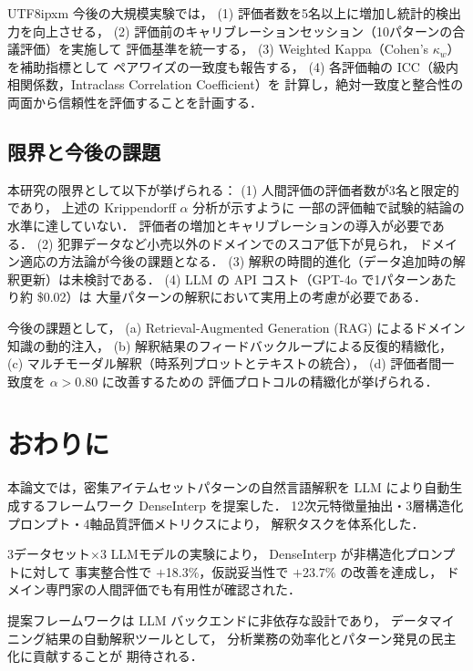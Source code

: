 \documentclass[conference]{IEEEtran}
\begin{document}
\begin{CJK}{UTF8}{ipxm}
今後の大規模実験では，
(1) 評価者数を5名以上に増加し統計的検出力を向上させる，
(2) 評価前のキャリブレーションセッション（10パターンの合議評価）を実施して
評価基準を統一する，
(3) Weighted Kappa（Cohen's $\kappa_w$）を補助指標として
ペアワイズの一致度も報告する，
(4) 各評価軸の ICC（級内相関係数，Intraclass Correlation Coefficient）を
計算し，絶対一致度と整合性の両面から信頼性を評価することを計画する．

\subsection{限界と今後の課題}

本研究の限界として以下が挙げられる：
(1) 人間評価の評価者数が3名と限定的であり，
上述の Krippendorff $\alpha$ 分析が示すように
一部の評価軸で試験的結論の水準に達していない．
評価者の増加とキャリブレーションの導入が必要である．
(2) 犯罪データなど小売以外のドメインでのスコア低下が見られ，
ドメイン適応の方法論が今後の課題となる．
(3) 解釈の時間的進化（データ追加時の解釈更新）は未検討である．
(4) LLM の API コスト（GPT-4o で1パターンあたり約 \$0.02）は
大量パターンの解釈において実用上の考慮が必要である．

今後の課題として，
(a) Retrieval-Augmented Generation (RAG) によるドメイン知識の動的注入，
(b) 解釈結果のフィードバックループによる反復的精緻化，
(c) マルチモーダル解釈（時系列プロットとテキストの統合），
(d) 評価者間一致度を $\alpha > 0.80$ に改善するための
評価プロトコルの精緻化が挙げられる．

\section{おわりに}
\label{sec:conclusion}

本論文では，密集アイテムセットパターンの自然言語解釈を
LLM により自動生成するフレームワーク DenseInterp を提案した．
12次元特徴量抽出・3層構造化プロンプト・4軸品質評価メトリクスにより，
解釈タスクを体系化した．

3データセット$\times$3 LLMモデルの実験により，
DenseInterp が非構造化プロンプトに対して
事実整合性で $+$18.3\%，仮説妥当性で $+$23.7\% の改善を達成し，
ドメイン専門家の人間評価でも有用性が確認された．

提案フレームワークは LLM バックエンドに非依存な設計であり，
データマイニング結果の自動解釈ツールとして，
分析業務の効率化とパターン発見の民主化に貢献することが
期待される．




\end{CJK}
\end{document}
